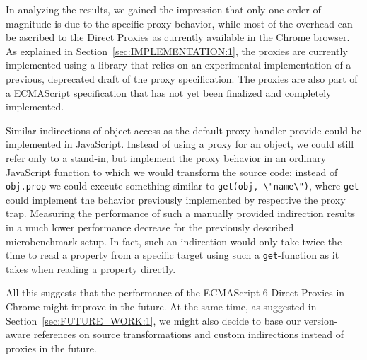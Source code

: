In analyzing the results, we gained the impression that only one order of magnitude is due to the specific proxy behavior, while most of the overhead can be ascribed to the Direct Proxies as currently available in the Chrome browser.
As explained in Section~\ref{sec:IMPLEMENTATION:1}, the proxies are currently implemented using a library that relies on an experimental implementation of a previous, deprecated draft of the proxy specification.
The proxies are also part of a ECMAScript specification that has not yet been finalized and completely implemented.

Similar indirections of object access as the default proxy handler provide could be implemented in JavaScript.
Instead of using a proxy for an object, we could still refer only to a stand-in, but implement the proxy behavior in an ordinary JavaScript function to which we would transform the source code: instead of \lstinline{obj.prop} we could execute something similar to \lstinline{get(obj, \"name\")}, where \lstinline{get} could implement the behavior previously implemented by respective the proxy trap.
Measuring the performance of such a manually provided indirection results in a much lower performance decrease for the previously described microbenchmark setup.
In fact, such an indirection would only take twice the time to read a property from a specific target using such a \lstinline{get}-function as it takes when reading a property directly. 

All this suggests that the performance of the ECMAScript 6 Direct Proxies in Chrome might improve in the future.
At the same time, as suggested in Section~\ref{sec:FUTURE_WORK:1}, we might also decide to base our version-aware references on source transformations and custom indirections instead of proxies in the future.


